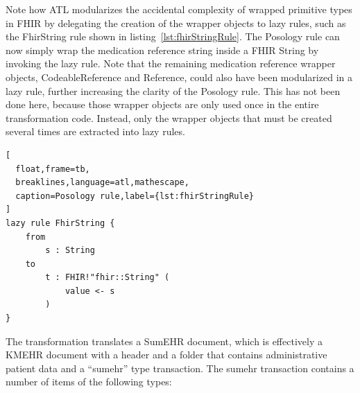 \documentclass[
twocolumn,
]{ceurart}
\begin{document}
Note how ATL modularizes the accidental complexity of wrapped primitive types
in FHIR by delegating the creation of the wrapper objects to lazy rules, such
as the FhirString rule shown in listing~\ref{lst:fhirStringRule}. The Posology rule
can now simply wrap the medication reference string inside a FHIR String by
invoking the lazy rule. Note that the remaining medication reference wrapper
objects, CodeableReference and Reference, could also have been modularized
in a lazy rule, further increasing the clarity of the Posology rule. This
has not been done here, because those wrapper objects are only used once
in the entire transformation code. Instead, only the wrapper objects that
must be created several times are extracted into lazy rules.

\begin{lstlisting}[
  float,frame=tb,
  breaklines,language=atl,mathescape,
  caption=Posology rule,label={lst:fhirStringRule}
]
lazy rule FhirString {
	from
		s : String
	to
		t : FHIR!"fhir::String" (
			value <- s
		)
}
\end{lstlisting}

The transformation translates a SumEHR document, which is effectively a KMEHR
document with a header and a folder that contains administrative patient
data and a ``sumehr'' type transaction. The sumehr transaction contains a
number of items of the following types:
\end{document}
